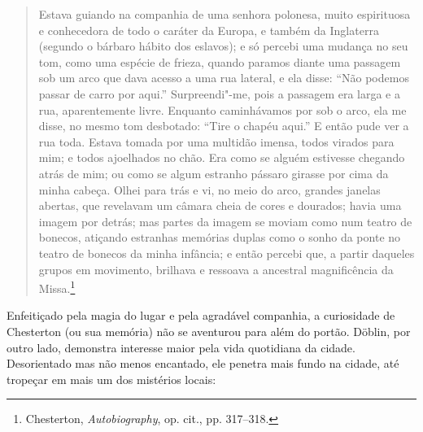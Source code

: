 \begin{quote}
Estava guiando na companhia de uma senhora polonesa, muito espirituosa e
conhecedora de todo o caráter da Europa, e também da Inglaterra (segundo
o bárbaro hábito dos eslavos); e só percebi uma mudança no seu tom, como
uma espécie de frieza, quando paramos diante uma passagem sob um arco
que dava acesso a uma rua lateral, e ela disse: ``Não podemos passar de
carro por aqui.'' Surpreendi"-me, pois a passagem era larga e a rua,
aparentemente livre. Enquanto caminhávamos por sob o arco, ela me disse,
no mesmo tom desbotado: ``Tire o chapéu aqui.'' E então pude ver a rua
toda. Estava tomada por uma multidão imensa, todos virados para mim; e
todos ajoelhados no chão. Era como se alguém estivesse chegando atrás de
mim; ou como se algum estranho pássaro girasse por cima da minha cabeça.
Olhei para trás e vi, no meio do arco, grandes janelas abertas, que
revelavam um câmara cheia de cores e dourados; havia uma imagem por
detrás; mas partes da imagem se moviam como num teatro de bonecos,
atiçando estranhas memórias duplas como o sonho da ponte no teatro de
bonecos da minha infância; e então percebi que, a partir daqueles grupos
em movimento, brilhava e ressoava a ancestral magnificência da
Missa.\footnote{Chesterton, \emph{Autobiography}, op. cit., pp. 317--318.}
\end{quote}

Enfeitiçado pela magia do lugar e pela agradável companhia, a
curiosidade de Chesterton (ou sua memória) não se aventurou para além do
portão. Döblin, por outro lado, demonstra interesse maior pela vida
quotidiana da cidade. Desorientado mas não menos encantado, ele penetra
mais fundo na cidade, até tropeçar em mais um dos mistérios locais:

